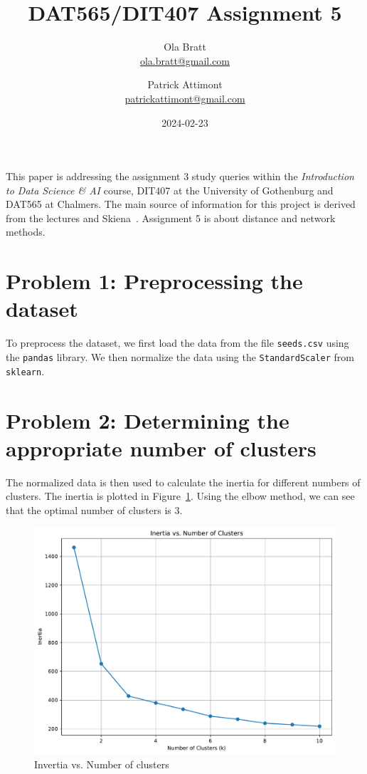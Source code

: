 \documentclass[a4paper]{article}
\begin{document}
\author{Ola Bratt \\
  \href{mailto:ola.bratt@gmail.com}{ola.bratt@gmail.com}
  \and
  Patrick Attimont \\
  \href{patrickattimont@gmail.com}{patrickattimont@gmail.com}
}

\title{DAT565/DIT407 Assignment 5}
\date{2024-02-23}

\maketitle

This paper is addressing the assignment 3 study queries within the \emph{Introduction to Data Science \& AI} course, DIT407 at 
the University of Gothenburg and DAT565 at Chalmers. The main source of information for this project
is derived from the lectures and Skiena~\cite{Skiena:2024}. Assignment 5 is about distance and network methods.

\section*{Problem 1: Preprocessing the dataset}
To preprocess the dataset, we first load the data from the file \texttt{seeds.csv} using the \texttt{pandas} library. 
We then normalize the data using the \texttt{StandardScaler} from \texttt{sklearn}.



\section*{Problem 2: Determining the appropriate number of clusters}


The normalized data is then used to calculate the inertia for different numbers of clusters. The inertia is plotted in Figure~\ref{fig:inertia}.
Using the elbow method, we can see that the optimal number of clusters is 3.

\begin{figure}[H]
  \begin{center}
    \includegraphics[width=\textwidth]{ola/intertia.pdf}
    \caption{Invertia vs. Number of clusters}
    \label{fig:inertia}
  \end{center}
\end{figure}
\end{document}
